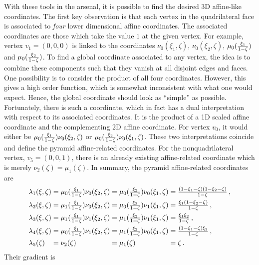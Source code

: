 With these tools in the arsenal, it is possible to find the desired 3D affine-like coordinates.
The first key observation is that each vertex in the quadrilateral face is associated to \textit{four} lower dimensional affine coordinates.
The associated coordinates are those which take the value $1$ at the given vertex.
For example, vertex $v_1=(0,0,0)$ is linked to the coordinates $\nu_0(\xi_1,\zeta)$, $\nu_0(\xi_2,\zeta)$, $\mu_0(\textstyle{\frac{\xi_1}{1-\zeta}})$ and $\mu_0(\textstyle{\frac{\xi_2}{1-\zeta}})$.
To find a global coordinate associated to any vertex, the idea is to combine these components such that they vanish at all disjoint edges and faces.
One possibility is to consider the product of all four coordinates.
However, this gives a high order function, which is somewhat inconsistent with what one would expect.
Hence, the global coordinate should look as ``simple'' as possible.
Fortunately, there is such a coordinate, which in fact has a dual interpretation with respect to its associated coordinates.
It is the product of a 1D scaled affine coordinate and the complementing 2D affine coordinate.
For vertex $v_0$, it would either be $\mu_0(\textstyle{\frac{\xi_1}{1-\zeta}})\nu_0(\xi_2,\zeta)$ or $\mu_0(\textstyle{\frac{\xi_2}{1-\zeta}})\nu_0(\xi_1,\zeta)$. 
These two interpretations coincide and define the pyramid affine-related coordinates.
For the nonquadrilateral vertex, $v_5=(0,0,1)$, there is an already existing affine-related coordinate which is merely $\nu_2(\zeta)=\mu_1(\zeta)$.
In summary, the pyramid affine-related coordinates are
\begin{equation}
	\begin{alignedat}{5}
		&\lambda_1(\xi,\zeta)&&=\mu_0(\textstyle{\frac{\xi_1}{1-\zeta}})\nu_0(\xi_2,\zeta)&&=\mu_0(\textstyle{\frac{\xi_2}{1-\zeta}})\nu_0(\xi_1,\zeta)
			&&=\textstyle{\frac{(1-\xi_1-\zeta)(1-\xi_2-\zeta)}{1-\zeta}}\,,\\
		&\lambda_2(\xi,\zeta)&&=\mu_1(\textstyle{\frac{\xi_1}{1-\zeta}})\nu_0(\xi_2,\zeta)&&=\mu_0(\textstyle{\frac{\xi_2}{1-\zeta}})\nu_1(\xi_1,\zeta)
			&&=\textstyle{\frac{\xi_1(1-\xi_2-\zeta)}{1-\zeta}}\,,\\
		&\lambda_3(\xi,\zeta)&&=\mu_1(\textstyle{\frac{\xi_1}{1-\zeta}})\nu_1(\xi_2,\zeta)&&=\mu_1(\textstyle{\frac{\xi_2}{1-\zeta}})\nu_1(\xi_1,\zeta)
			&&=\textstyle{\frac{\xi_1\xi_2}{1-\zeta}}\,,\\
		&\lambda_4(\xi,\zeta)&&=\mu_0(\textstyle{\frac{\xi_1}{1-\zeta}})\nu_1(\xi_2,\zeta)&&=\mu_1(\textstyle{\frac{\xi_2}{1-\zeta}})\nu_0(\xi_1,\zeta)
			&&=\textstyle{\frac{(1-\xi_1-\zeta)\xi_2}{1-\zeta}}\,,\\
		&\lambda_5(\zeta)&&=\nu_2(\zeta)&&=\mu_1(\zeta)&&=\zeta\,.
	\end{alignedat}
	\label{eq:PyramidAffineCoord}
\end{equation}
Their gradient is
